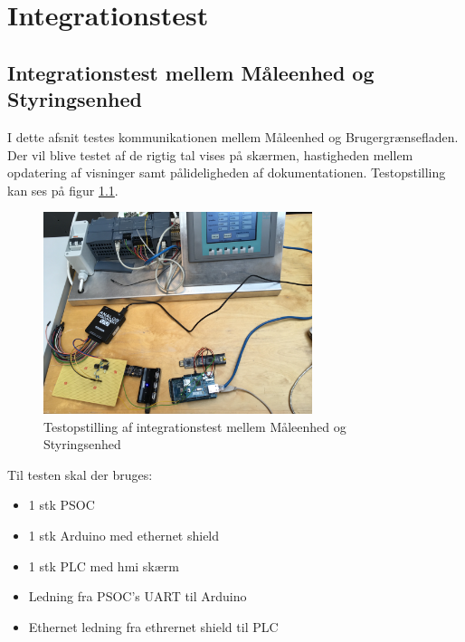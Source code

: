 
\chapter{Integrationstest}

\section{Integrationstest mellem Måleenhed og Styringsenhed}

I dette afsnit testes kommunikationen mellem Måleenhed og Brugergrænsefladen. Der vil blive testet af de rigtig tal vises på skærmen, hastigheden mellem opdatering af visninger samt pålideligheden af dokumentationen. Testopstilling kan ses på figur \ref{fig:opstilling1}.

\begin{figure}[htbp] %
	\centering
	\includegraphics[width=0.7\textwidth]{Test/Opstilling1}
	\caption{Testopstilling af integrationstest mellem Måleenhed og Styringsenhed}
	\label{fig:opstilling1}
\end{figure}

Til testen skal der bruges:
\begin{itemize}
	\item 1 stk PSOC
	\item 1 stk Arduino med ethernet shield
	\item 1 stk PLC med hmi skærm
	\item Ledning fra PSOC's UART til Arduino
	\item Ethernet ledning fra ethrernet shield til PLC
\end{itemize}

